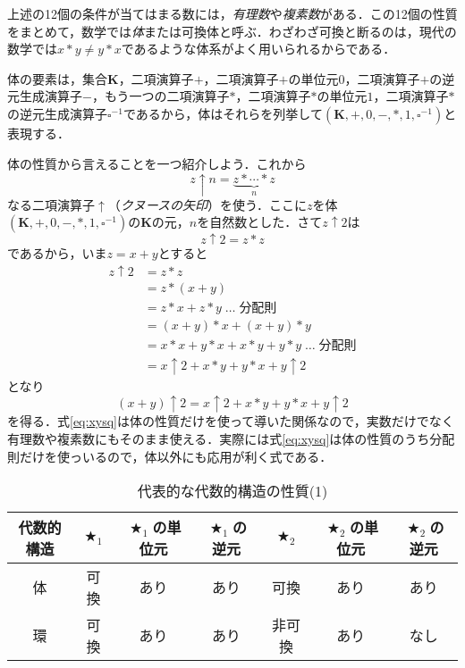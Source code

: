 \documentclass[twocolumn]{jsbook}
\newcommand{\keyword}[1]{{\emph{#1}}}
\DeclareMathOperator{\mathAnyBinaryOperator}{\bigstar}
\newcommand{\mathSomething}{\square}
\newcommand{\mathSet}[1]{\mathbf{#1}}
\newcommand{\mathField}[7]{(#1,#2,#3,#4,#5,#6,#7)}
\begin{document}
上述の12個の条件が当てはまる数には，\keyword{有理数}や\keyword{複素数}がある．この12個の性質をまとめて，数学では\keyword{体}または可換体と呼ぶ．わざわざ可換と断るのは，現代の数学では$x*y\neq y*x$であるような体系がよく用いられるからである．

体の要素は，集合$\mathSet{K}$，二項演算子$+$，二項演算子$+$の単位元$0$，二項演算子$+$の逆元生成演算子$-$，もう一つの二項演算子$*$，二項演算子$*$の単位元$1$，二項演算子$*$の逆元生成演算子$\mathSomething^{-1}$であるから，体はそれらを列挙して$\mathField{\mathSet{K}}{+}{0}{-}{*}{1}{\mathSomething^{-1}}$と表現する．

体の性質から言えることを一つ紹介しよう．これから$$z\uparrow n=\underbrace{z*\dotsb*z}_n$$なる二項演算子$\uparrow$（\keyword{クヌースの矢印}）を使う．ここに$z$を体$\mathField{\mathSet{K}}{+}{0}{-}{*}{1}{\mathSomething^{-1}}$の$\mathSet{K}$の元，$n$を自然数とした．さて$z\uparrow2$は$$z\uparrow2=z*z$$であるから，いま$z=x+y$とすると
\begin{align*}
z\uparrow2&=z*z\\
&=z*(x+y)\\
&=z*x+z*y\;\dots\;\text{分配則}\\
&=(x+y)*x+(x+y)*y\\
&=x*x+y*x+x*y+y*y\;\dots\;\text{分配則}\\
&=x\uparrow2+x*y+y*x+y\uparrow2
\end{align*}
となり
\begin{equation}
\label{eq:xysq}
(x+y)\uparrow2=x\uparrow2+x*y+y*x+y\uparrow2
\end{equation}
を得る．式\eqref{eq:xysq}は体の性質だけを使って導いた関係なので，実数だけでなく有理数や複素数にもそのまま使える．実際には式\eqref{eq:xysq}は体の性質のうち分配則だけを使っいるので，体以外にも応用が利く式である．

\begin{table*}
\caption{代表的な代数的構造の性質(1)}
\label{tab:field-and-ring}
\begin{center}
\begin{tabular}{||c||c|c|c|c|c|c||}
\hline
代数的構造&$\mathAnyBinaryOperator_1$&$\mathAnyBinaryOperator_1$の単位元&$\mathAnyBinaryOperator_1$の逆元&$\mathAnyBinaryOperator_2$&$\mathAnyBinaryOperator_2$の単位元&$\mathAnyBinaryOperator_2$の逆元\\
\hline\hline
体&可換&あり&あり&可換&あり&あり\\
環&可換&あり&あり&非可換&あり&なし\\
\hline
\end{tabular}
\end{center}
\end{table*}
\end{document}
